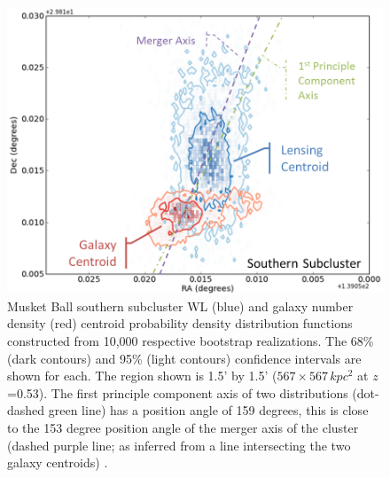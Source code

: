 \begin{figure}
\centering
\includegraphics[width=5in]{Chapter4/AnalysisFiles/southcentroids_histplot2d_reformat.png}
\caption[Musket Ball southern subcluster galaxy and weak lensing centroid spatial distribution.]{
Musket Ball southern subcluster WL (blue) and galaxy number density (red) centroid probability density distribution functions constructed from 10,000 respective bootstrap realizations.
The 68\% (dark contours) and 95\% (light contours) confidence intervals are shown for each.
The region shown is 1.5' by 1.5' ($567\times 567\,kpc^2$ at $z$=0.53).
The first principle component axis of two distributions (dot-dashed green line) has a position angle of 159 degrees, this is close to the 153 degree position angle of the merger axis of the cluster (dashed purple line; as inferred from a line intersecting the two galaxy centroids) .
}
\label{figure:CentroidDist_South}
\end{figure}




